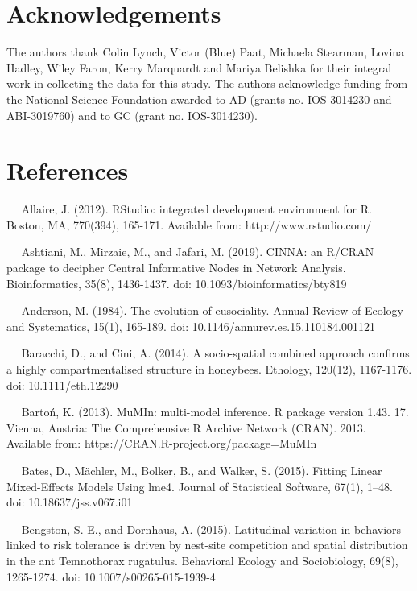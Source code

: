 \documentclass[3p]{elsarticle} %
\begin{document}
\hypertarget{acknowledgements}{%
\section{Acknowledgements}\label{acknowledgements}}

The authors thank Colin Lynch, Victor (Blue) Paat, Michaela Stearman,
Lovina Hadley, Wiley Faron, Kerry Marquardt and Mariya Belishka for
their integral work in collecting the data for this study. The authors
acknowledge funding from the National Science Foundation awarded to AD
(grants no. IOS-3014230 and ABI-3019760) and to GC (grant no.
IOS-3014230).

\hypertarget{references}{%
\section{References}\label{references}}

~~ Allaire, J. (2012). RStudio: integrated development environment for
R. Boston, MA, 770(394), 165-171. Available from:
http://www.rstudio.com/

~~ Ashtiani, M., Mirzaie, M., and Jafari, M. (2019). CINNA: an R/CRAN
package to decipher Central Informative Nodes in Network Analysis.
Bioinformatics, 35(8), 1436-1437. doi: 10.1093/bioinformatics/bty819

~~ Anderson, M. (1984). The evolution of eusociality. Annual Review of
Ecology and Systematics, 15(1), 165-189. doi:
10.1146/annurev.es.15.110184.001121

~~ Baracchi, D., and Cini, A. (2014). A socio-spatial combined approach
confirms a highly compartmentalised structure in honeybees. Ethology,
120(12), 1167-1176. doi: 10.1111/eth.12290

~~ Bartoń, K. (2013). MuMIn: multi-model inference. R package version
1.43. 17. Vienna, Austria: The Comprehensive R Archive Network (CRAN).
2013. Available from: https://CRAN.R-project.org/package=MuMIn

~~ Bates, D., Mächler, M., Bolker, B., and Walker, S. (2015). Fitting
Linear Mixed-Effects Models Using lme4. Journal of Statistical Software,
67(1), 1--48. doi: 10.18637/jss.v067.i01

~~ Bengston, S. E., and Dornhaus, A. (2015). Latitudinal variation in
behaviors linked to risk tolerance is driven by nest-site competition
and spatial distribution in the ant Temnothorax rugatulus. Behavioral
Ecology and Sociobiology, 69(8), 1265-1274. doi:
10.1007/s00265-015-1939-4
\end{document}
